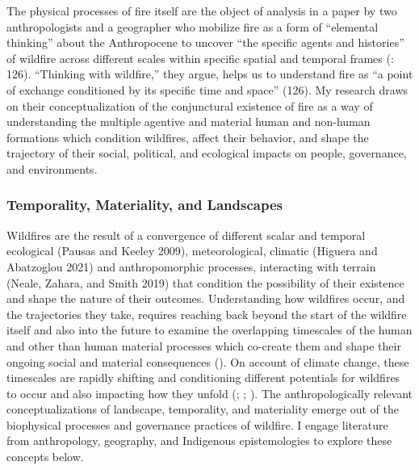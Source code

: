 \documentclass[
]{article}
\begin{document}
The physical processes of fire itself are the object of analysis in a paper by two anthropologists and a geographer who mobilize fire as a form of ``elemental thinking'' about the Anthropocene to uncover ``the specific agents and histories'' of wildfire across different scales within specific spatial and temporal frames (: 126). ``Thinking with wildfire,'' they argue, helps us to understand fire as ``a point of exchange conditioned by its specific time and space'' (126). My research draws on their conceptualization of the conjunctural existence of fire as a way of understanding the multiple agentive and material human and non-human formations which condition wildfires, affect their behavior, and shape the trajectory of their social, political, and ecological impacts on people, governance, and environments.

\subsubsection{Temporality, Materiality, and Landscapes}\label{temporality-materiality-and-landscapes}

Wildfires are the result of a convergence of different scalar and temporal ecological (Pausas and Keeley 2009), meteorological, climatic (Higuera and Abatzoglou 2021) and anthropomorphic processes, interacting with terrain (Neale, Zahara, and Smith 2019) that condition the possibility of their existence and shape the nature of their outcomes. Understanding how wildfires occur, and the trajectories they take, requires reaching back beyond the start of the wildfire itself and also into the future to examine the overlapping timescales of the human and other than human material processes which co-create them and shape their ongoing social and material consequences (). On account of climate change, these timescales are rapidly shifting and conditioning different potentials for wildfires to occur and also impacting how they unfold (; ; ). The anthropologically relevant conceptualizations of landscape, temporality, and materiality emerge out of the biophysical processes and governance practices of wildfire. I engage literature from anthropology, geography, and Indigenous epistemologies to explore these concepts below.
\end{document}
